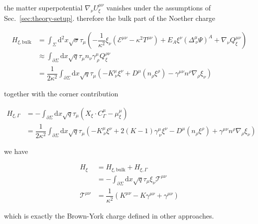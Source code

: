 the matter superpotential $\displaystyle{\nabla _{\nu}U_{\xi}^{\mu \nu}}$ vanishes under the assumptions of Sec.~\ref{sec:theory-setup}. therefore the bulk part of the Noether charge

\begin{align}
H_{\xi,\mathrm{bulk}} & =\int _{\Sigma}\mathrm{d}^{2}x\sqrt{ \sigma }\tau _{\mu}\left(-\dfrac{1}{\kappa ^{2}}\xi _{\nu}(\mathcal{E}^{\mu \nu}-\kappa ^{2}T^{\mu \nu})+E_{A}\xi ^{\nu}(\Delta ^{\mu}_{~\nu}\Psi)^{A}+\nabla _{\nu}Q_{\xi}^{\mu \nu}\right) \\
 & \approx \int _{\partial \Sigma}\mathrm{d}x\sqrt{ q }\tau _{\mu}n_{\nu}\gamma ^{\mu}_{~\rho}Q^{\rho \nu}_{\xi} \\
 & =\dfrac{1}{2\kappa ^{2}}\int _{\partial \Sigma}\mathrm{d}x\sqrt{ q }\tau _{\mu}\left(-K^{\mu}_{~\nu}\xi ^{\nu}+D^{\mu}(n_{\rho}\xi ^{\rho})-\gamma ^{\mu \nu}n^{\rho}\nabla _{\rho}\xi _{\nu}\right)
\end{align}

together with the corner contribution

\begin{align}
H_{\xi,\Gamma} & =-\int _{\partial \Sigma}\mathrm{d}x\sqrt{ q }\tau _{\mu}\left(X_{\xi}\cdot C_{\Gamma}^{\mu}-\mu _{\xi}^{\mu}\right) \\
 & =\dfrac{1}{2\kappa ^{2}} \int _{\partial \Sigma}\mathrm{d}x\sqrt{ q }\tau _{\mu}\left(-K^{\mu}_{~\nu}\xi ^{\nu}+2(K-1)\gamma ^{\mu}_{~\nu}\xi ^{\nu}-D^{\mu}(n_{\rho}\xi ^{\rho})+\gamma ^{\mu \nu}n^{\rho}\nabla _{\rho}\xi _{\nu}\right)
\end{align}

we have

\begin{align}
H_{\xi} & =H_{\xi,\mathrm{bulk}}+H_{\xi,\Gamma} \\
 & =-\int _{\partial \Sigma}\mathrm{d}x\sqrt{ q }\tau _{\mu}\xi _{\nu}\mathcal{T}^{\mu \nu} \\
\mathcal{T}^{\mu \nu} & =\dfrac{1}{\kappa ^{2}}(K^{\mu \nu}-K\gamma ^{\mu \nu}+\gamma ^{\mu \nu})
\end{align}

which is exactly the Brown-York charge defined in other approaches.
